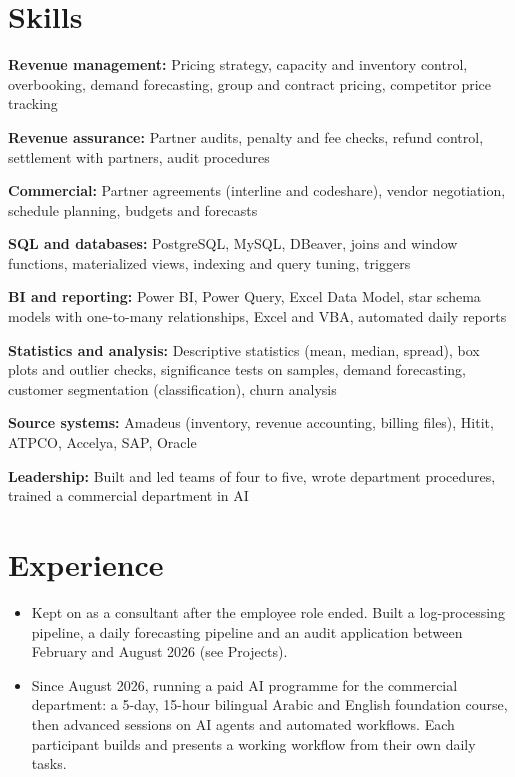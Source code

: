\section{Skills}
\textbf{Revenue management:} Pricing strategy, capacity and inventory control, overbooking, demand forecasting, group and contract pricing, competitor price tracking\par\vspace{1pt}
\textbf{Revenue assurance:} Partner audits, penalty and fee checks, refund control, settlement with partners, audit procedures\par\vspace{1pt}
\textbf{Commercial:} Partner agreements (interline and codeshare), vendor negotiation, schedule planning, budgets and forecasts\par\vspace{1pt}
\textbf{SQL and databases:} PostgreSQL, MySQL, DBeaver, joins and window functions, materialized views, indexing and query tuning, triggers\par\vspace{1pt}
\textbf{BI and reporting:} Power BI, Power Query, Excel Data Model, star schema models with one-to-many relationships, Excel and VBA, automated daily reports\par\vspace{1pt}
\textbf{Statistics and analysis:} Descriptive statistics (mean, median, spread), box plots and outlier checks, significance tests on samples, demand forecasting, customer segmentation (classification), churn analysis\par\vspace{1pt}
\textbf{Source systems:} Amadeus (inventory, revenue accounting, billing files), Hitit, ATPCO, Accelya, SAP, Oracle\par\vspace{1pt}
\textbf{Leadership:} Built and led teams of four to five, wrote department procedures, trained a commercial department in AI\par\vspace{1pt}

\section{Experience}
\begin{itemize}
  \item Kept on as a consultant after the employee role ended. Built a log-processing pipeline, a daily forecasting pipeline and an audit application between February and August 2026 (see Projects).
  \item Since August 2026, running a paid AI programme for the commercial department: a 5-day, 15-hour bilingual Arabic and English foundation course, then advanced sessions on AI agents and automated workflows. Each participant builds and presents a working workflow from their own daily tasks.
\end{itemize}

